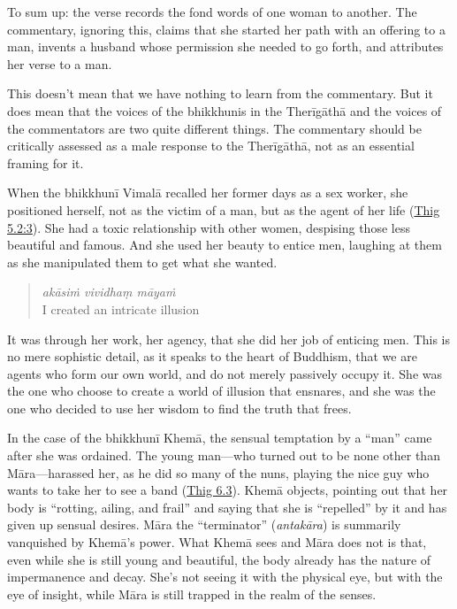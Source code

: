 \documentclass[12pt,openany]{book}%
\begin{document}
To sum up: the verse records the fond words of one woman to another. The commentary, ignoring this, claims that she started her path with an offering to a man, invents a husband whose permission she needed to go forth, and attributes her verse to a man.

This doesn’t mean that we have nothing to learn from the commentary. But it does mean that the voices of the bhikkhunis in the \textsanskrit{Therīgāthā} and the voices of the commentators are two quite different things. The commentary should be critically assessed as a male response to the \textsanskrit{Therīgāthā}, not as an essential framing for it.

When the \textsanskrit{bhikkhunī} \textsanskrit{Vimalā} recalled her former days as a sex worker, she positioned herself, not as the victim of a man, but as the agent of her life (\href{https://suttacentral.net/thig5.2/en/sujato\#3.1}{Thig 5.2:3}). She had a toxic relationship with other women, despising those less beautiful and famous. And she used her beauty to entice men, laughing at them as she manipulated them to get what she wanted.

\begin{verse}%
\textit{\textsanskrit{akāsiṁ} vividhaṃ \textsanskrit{māyaṁ}} \\
I created an intricate illusion

%
\end{verse}

It was through her work, her agency, that she did her job of enticing men. This is no mere sophistic detail, as it speaks to the heart of Buddhism, that we are agents who form our own world, and do not merely passively occupy it. She was the one who choose to create a world of illusion that ensnares, and she was the one who decided to use her wisdom to find the truth that frees.

In the case of the \textsanskrit{bhikkhunī} \textsanskrit{Khemā}, the sensual temptation by a “man” came after she was ordained. The young man—who turned out to be none other than \textsanskrit{Māra}—harassed her, as he did so many of the nuns, playing the nice guy who wants to take her to see a band (\href{https://suttacentral.net/thig6.3}{Thig 6.3}). \textsanskrit{Khemā} objects, pointing out that her body is “rotting, ailing, and frail” and saying that she is “repelled” by it and has given up sensual desires. \textsanskrit{Māra} the “terminator” (\textit{\textsanskrit{antakāra}}) is summarily vanquished by \textsanskrit{Khemā}’s power. What \textsanskrit{Khemā} sees and \textsanskrit{Māra} does not is that, even while she is still young and beautiful, the body already has the nature of impermanence and decay. She’s not seeing it with the physical eye, but with the eye of insight, while \textsanskrit{Māra} is still trapped in the realm of the senses.
\end{document}
